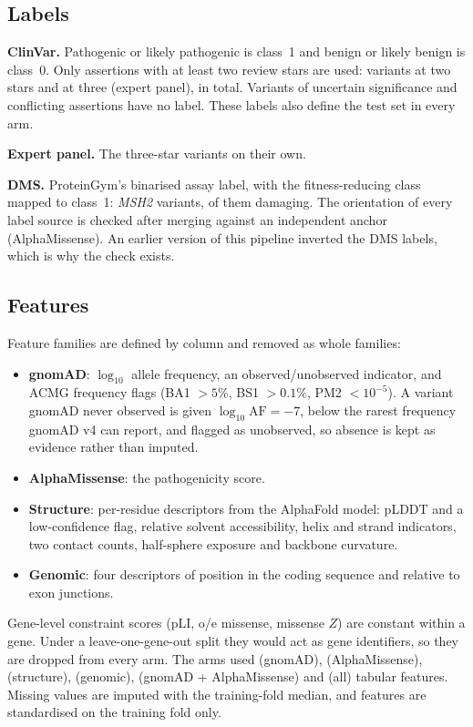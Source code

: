 \documentclass[11pt]{article}
\newcommand{\gene}[1]{\textit{#1}}
\begin{document}
\subsection{Labels}

\textbf{ClinVar.} Pathogenic or likely pathogenic is class~1 and benign or likely benign
is class~0. Only assertions with at least two review stars are used: \nTwoStar{} variants
at two stars and \nThreeStar{} at three (expert panel), \nLabelled{} in total. Variants
of uncertain significance and conflicting assertions have no label. These labels also
define the test set in every arm.

\textbf{Expert panel.} The \nExpert{} three-star variants on their own.

\textbf{DMS.} ProteinGym's binarised assay label, with the fitness-reducing class mapped
to class~1: \nDms{} \gene{MSH2} variants, \nDmsPathogenic{} of them damaging. The
orientation of every label source is checked after merging against an independent anchor
(AlphaMissense). An earlier version of this pipeline inverted the DMS labels, which is
why the check exists.

\subsection{Features}

Feature families are defined by column and removed as whole families:
\begin{itemize}
\item \textbf{gnomAD}: $\log_{10}$ allele frequency, an observed/unobserved indicator, and
  ACMG frequency flags (BA1 $>5\%$, BS1 $>0.1\%$, PM2 $<10^{-5}$). A variant gnomAD never
  observed is given $\log_{10}\mathrm{AF}=-7$, below the rarest frequency gnomAD v4 can
  report, and flagged as unobserved, so absence is kept as evidence rather than imputed.
\item \textbf{AlphaMissense}: the pathogenicity score.
\item \textbf{Structure}: \nFeatAThree{} per-residue descriptors from the AlphaFold model:
  pLDDT and a low-confidence flag, relative solvent accessibility, helix and strand
  indicators, two contact counts, half-sphere exposure and backbone curvature.
\item \textbf{Genomic}: four descriptors of position in the coding sequence and relative
  to exon junctions.
\end{itemize}
Gene-level constraint scores (pLI, o/e missense, missense $Z$) are constant within a gene.
Under a leave-one-gene-out split they would act as gene identifiers, so they are dropped
from every arm. The arms used \nFeatAOne{} (gnomAD), \nFeatATwo{} (AlphaMissense),
\nFeatAThree{} (structure), \nFeatAFour{} (genomic), \nFeatM{} (gnomAD + AlphaMissense) and
\nFeatAFive{} (all) tabular features. Missing values are imputed with the training-fold
median, and features are standardised on the training fold only.
\end{document}
